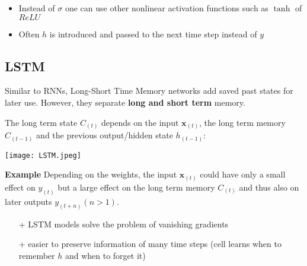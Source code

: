 \newpar{}
\begin{itemize}
    \item Instead of $\sigma$ one can use other nonlinear activation functions such as $\tanh$ of $ReLU$
    \item Often $h$ is introduced and passed to the next time step instead of $y$
\end{itemize}


\subsection{LSTM}
Similar to RNNs, Long-Short Time Memory networks add saved past states for later use. However, they separate \textbf{long and short term} memory.

The long term state $C_{(t)}$ depends on the input $\mathbf{x}_{(t)}$, the long term memory $C_{(t-1)}$ and the previous output/hidden state $h_{(t-1)}$:
\begin{center}
    \texttt{[image: LSTM.jpeg]}
\end{center}

\textbf{Example}
Depending on the weights, the input $\mathbf{x}_{(t)}$ could have only a small effect on $y_{(t)}$ but a large effect on the long term memory $C_{(t)}$ and thus also on later outputs $y_{(t+n)} (n>1)$.

\newpar{}
\begin{itemize}
    \item [+] LSTM models solve the problem of vanishing gradients
    \item [+] easier to preserve information of many time steps (cell learns when to remember $h$ and when to forget it)
\end{itemize}

